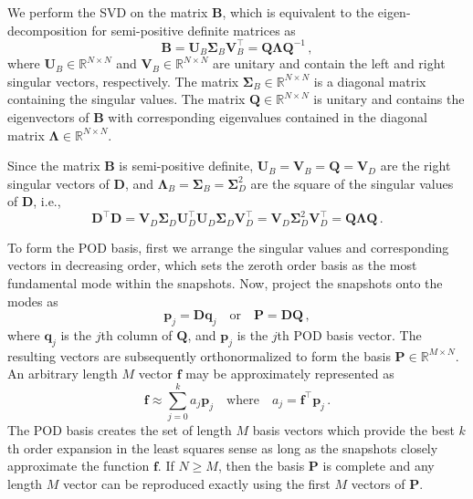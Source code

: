 \documentclass[5p,times,twocolumn,10pt]{elsarticle}
\renewcommand{\vec}[1]{\bm{#1}} %
\newcommand{\mat}[1]{\ensuremath{\bm{#1}}}
\renewcommand{\vec}[1]{\ensuremath{\bm{#1}}}
\begin{document}
    We perform the SVD on the matrix $\mat{B}$, which is equivalent to the eigen-decomposition for semi-positive definite matrices as
    \begin{equation}
        \mat{B}=\mat{U}_B\mat{\Sigma}_B\mat{V}_B^\intercal=\mat{Q}\mat{\Lambda}\mat{Q}^{-1}\, ,
    \end{equation}
    where $\mat{U}_B\in\mathbb{R}^{N\times N}$ and $\mat{V}_B\in\mathbb{R}^{N\times N}$ are unitary and contain the left and right singular vectors, respectively.
    The matrix $\mat{\Sigma}_B\in\mathbb{R}^{N\times N}$ is a diagonal matrix containing the singular values.
    The matrix $\mat{Q}\in\mathbb{R}^{N\times N}$ is unitary and contains the eigenvectors of $\mat{B}$ with corresponding eigenvalues contained in the diagonal matrix $\mat{\Lambda}\in\mathbb{R}^{N\times N}$.
    
    Since the matrix $\mat{B}$ is semi-positive definite, $\mat{U}_B=\mat{V}_B=\mat{Q}=\mat{V}_D$ are the right singular vectors of $\mat{D}$, and $\mat{\Lambda}_B=\mat{\Sigma}_B=\mat{\Sigma}_D^2$ are the square of the singular values of $\mat{D}$, i.e.,
    \begin{equation}
        \mat{D}^\intercal\mat{D}
        =\mat{V}_D\mat{\Sigma}_D\mat{U}_D^\intercal\mat{U}_D\mat{\Sigma}_D\mat{V}_D^\intercal
        =\mat{V}_D\mat{\Sigma}_D^2\mat{V}_D^\intercal
        =\mat{Q}\mat{\Lambda}\mat{Q}\, .
    \end{equation} 
    
    To form the POD basis, first we arrange the singular values and corresponding vectors in decreasing order, which sets the zeroth order basis as the most fundamental mode within the snapshots.
    Now, project the snapshots onto the modes as
    \begin{equation}
        \vec{p}_{j}=\mat{D}\vec{q}_j \quad \text{or}\quad \mat{P}=\mat{D}\mat{Q}\, ,
    \end{equation}
    where $\vec{q}_j$ is the $j$th column of $\mat{Q}$, and $\vec{p}_j$ is the $j$th POD basis vector.
    The resulting vectors are subsequently orthonormalized to form the basis $\mat{P}\in\mathbb{R}^{M\times N}$.
    An arbitrary length $M$ vector $\vec{f}$ may be approximately represented as
    \begin{equation}
        \vec{f}\approx\sum_{j=0}^k a_j \vec{p}_j\quad\text{where}\quad a_j=\vec{f}^\intercal \vec{p}_j\, .
    \end{equation}
    The POD basis creates the set of length $M$ basis vectors which provide the best $k$th order expansion in the least squares sense as long as the snapshots closely approximate the function $\vec{f}$.
    If $N\geq M$, then the basis $\mat{P}$ is complete and any length $M$ vector can be reproduced exactly using the first $M$ vectors of $\mat{P}$.
    
\end{document}
